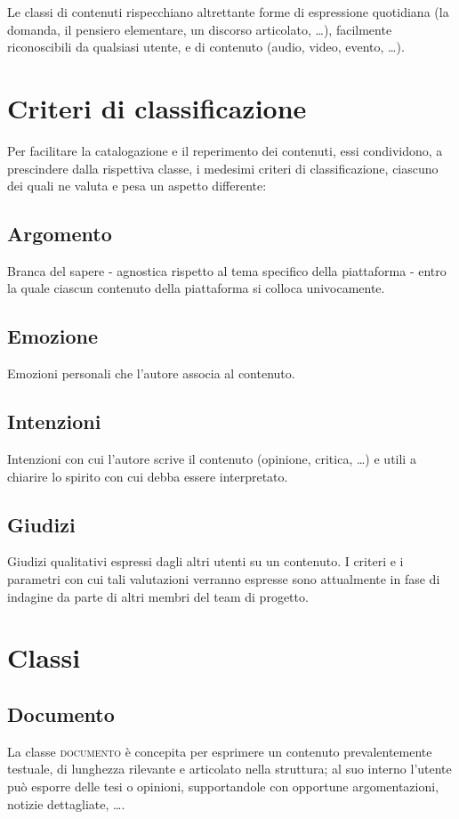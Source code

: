 \documentclass[10pt,a4paper,headinclude,footinclude,hidelinks]{scrreprt} %
\begin{document}
	Le classi di contenuti rispecchiano altrettante forme di espressione quotidiana (la domanda, il pensiero elementare, un discorso articolato, \ldots), facilmente riconoscibili da qualsiasi utente, e di contenuto (audio, video, evento, \ldots).

	\section{Criteri di classificazione}
	Per facilitare la catalogazione e il reperimento dei contenuti, essi condividono, a prescindere dalla rispettiva classe, i medesimi criteri di classificazione, ciascuno dei quali ne valuta e pesa un aspetto differente:
	\subsection{Argomento}
	Branca del sapere - agnostica rispetto al tema specifico della piattaforma - entro la quale ciascun contenuto della piattaforma si colloca univocamente.
	\subsection{Emozione}
	Emozioni personali che l'autore associa al contenuto.
	\subsection{Intenzioni}
	Intenzioni con cui l'autore scrive il contenuto (opinione, critica, \ldots) e utili a chiarire lo spirito con cui debba essere interpretato.
	\subsection{Giudizi}
	Giudizi qualitativi espressi dagli altri utenti su un contenuto. I criteri e i parametri con cui tali valutazioni verranno espresse sono attualmente in fase di indagine da parte di altri membri del team di progetto.

	\section{Classi}

	\subsection{Documento}
	La classe \textsc{documento} è concepita per esprimere un contenuto prevalentemente testuale, di lunghezza rilevante e articolato nella struttura; al suo interno l'utente può esporre delle tesi o opinioni, supportandole con opportune argomentazioni, notizie dettagliate, \ldots.
\end{document}
